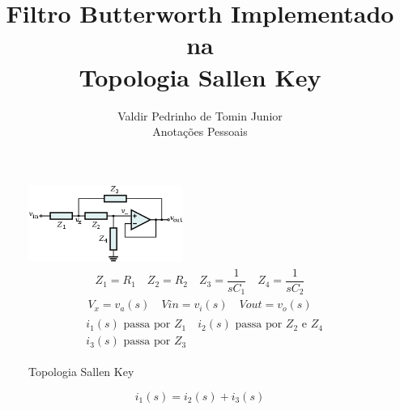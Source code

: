 \documentclass[journal]{IEEEtran}
\newcommand{\keywords}[1]{\textbf{\small{\textit{Palavras-chave~---}} #1}}
\renewcommand{\abstract}[1]{\textbf{\small{\textit{Resumo~---}} #1}}
\begin{document}
\title{Filtro Butterworth Implementado na\\ Topologia Sallen Key}

\author
{
  \IEEEauthorblockN
  {
    Valdir Pedrinho de Tomin Junior\\
    \IEEEauthorblockA
    {
      Anotações Pessoais\\
    }      
  }
}
\maketitle



\begin{figure}
 \centering
 \includegraphics[width=0.45\textwidth]{Sallen-Key_Generic_Circuit} 
 \begin{eqnarray*} 
  Z_1 = R_1\quad
  Z_2 = R_2\quad
  Z_3 = \dfrac{1}{sC_1}\quad
  Z_4 = \dfrac{1}{sC_2}
 \end{eqnarray*}
 \begin{eqnarray*} 
  V_x = v_a(s)\quad
  Vin = v_i(s)\quad
  Vout = v_o(s)
 \end{eqnarray*}
 \begin{eqnarray*}
 \begin{aligned}
  & i_1(s) \textrm{ passa por } Z_1\quad
  i_2(s) \textrm{ passa por } Z_2 \textrm{ e } Z_4\\
  & i_3(s) \textrm{ passa por } Z_3
 \end{aligned} 
 \end{eqnarray*} 
 \caption{Topologia Sallen Key}
\end{figure}

\begin{equation}\label{eq_soma_correntes}
 i_1(s) = i_2(s) + i_3(s)
\end{equation}

% 
\end{document}
